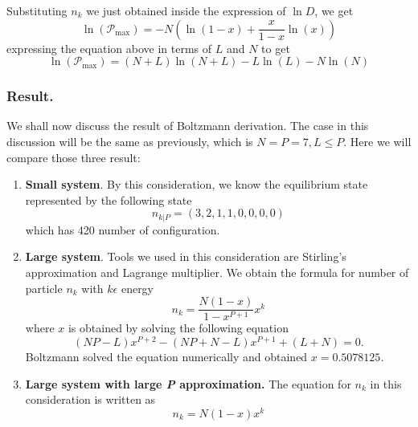 \documentclass[../../../Main.tex]{subfiles}
\begin{document}
Substituting $n_k$ we just obtained inside the expression of $\ln D$, we get 
\begin{equation*}
    \ln(\mathcal{P}_\text{max})=-N\left(\ln (1-x)+\frac{x}{1-x}\ln (x)\right)
\end{equation*}
expressing the equation above in terms of $L$ and $N$ to get 
\begin{equation*}
    \ln(\mathcal{P}_\text{max})= (N+L)\ln (N+L) - L\ln (L)-N\ln (N)
\end{equation*}

\subsubsection*{Result.} We shall now discuss the result of Boltzmann derivation. The case in this discussion will be the same as previously, which is $N = P = 7 , L \leq P$. Here we will compare those three result: 
\begin{enumerate}
    \item \textbf{Small system}. By this consideration, we know the equilibrium state represented by the following state \begin{equation*}
        n_{k|P}=(3, 2, 1, 1, 0, 0, 0, 0)
    \end{equation*} which has 420 number of configuration.
    \item \textbf{Large system}. Tools we used in this consideration are Stirling's approximation and Lagrange multiplier. We obtain the formula for number of particle $n_k$ with $k\epsilon$ energy \begin{equation*}
        n_k=\frac{N(1-x)}{1-x^{P+1}}x^k
    \end{equation*}
    where $x$ is obtained by solving the following equation
    \begin{equation*}
        (N P - L)x^{P+2} - (NP + N - L)x^{P+1} + (L + N ) = 0.
    \end{equation*}
    Boltzmann solved the equation numerically and obtained $x=0.5078125$.
    \item \textbf{Large system with large \emph{P} approximation.} The equation for $n_k$ in this consideration is written as \begin{equation*}
        n_k= N (1 - x)x^k 
    \end{equation*}
\end{enumerate}
\end{document}
